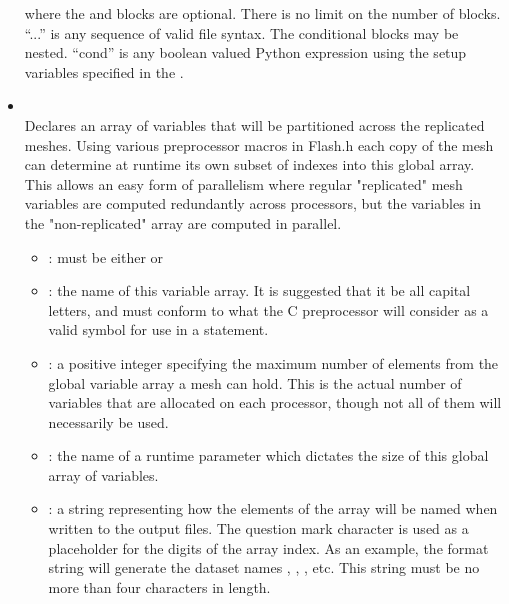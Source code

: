 \begin{itemize}
\noindent where the  and  blocks are optional. There
is no limit on the number of  blocks. ``...'' is any sequence
of valid  file syntax. The conditional blocks may be nested.
``cond'' is any boolean valued Python expression using the setup variables
specified in the .

\item {}    
\\
Declares an array of  variables that will be partitioned across the
replicated meshes.  Using various preprocessor macros in Flash.h each copy of
the mesh can determine at runtime its own subset of indexes into this global
array.  This allows an easy form of parallelism where regular "replicated"
mesh variables are computed redundantly across processors, but the variables in
the "non-replicated" array are computed in parallel.

\begin{itemize}
\item {}: must be either  or \\

\item {}: the name of this variable array.  It is suggested that it be
all capital letters, and must conform to what the C preprocessor will consider as
a valid symbol for use in a  statement.

\item {}: a positive integer specifying the maximum number of elements
from the global variable array a mesh can hold.  This is the actual number of
 variables that are allocated on each processor, though not all of
them will necessarily be used.\\

\item {}: the name of a runtime parameter which dictates the size
of this global array of variables.\\

\item {}: a string representing how the elements of the array will
be named when written to the output files.  The question mark character  is
used as a placeholder for the digits of the array index.  As an example, the format
string  will generate the dataset names , ,
, etc.  This string must be no more than four characters in length.\\
\end{itemize}


\end{itemize}
